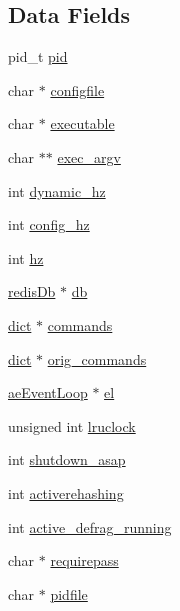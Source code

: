 \subsection*{Data Fields}
\begin{DoxyCompactItemize}
\item 
pid\+\_\+t \hyperlink{structredis_server_ae0d46a978d5cd6707411f276ad869b9c}{pid}
\item 
char $\ast$ \hyperlink{structredis_server_a761e2c812e0a5ab3b7afcbb2586d4012}{configfile}
\item 
char $\ast$ \hyperlink{structredis_server_afa475ce704a1c8de8a4472f89ba59fd4}{executable}
\item 
char $\ast$$\ast$ \hyperlink{structredis_server_a2073b64fc7793a03e76ed750a46dd25e}{exec\+\_\+argv}
\item 
int \hyperlink{structredis_server_abb58a3bfa3d302d8c4b74b7c4f59644b}{dynamic\+\_\+hz}
\item 
int \hyperlink{structredis_server_aeae2d40a88ece004cc0fa4bc228077a8}{config\+\_\+hz}
\item 
int \hyperlink{structredis_server_a873124c5659edc141c67aab7999e314a}{hz}
\item 
\hyperlink{structredis_db}{redis\+Db} $\ast$ \hyperlink{structredis_server_a9bee04e09635a42fef289e42a89f5502}{db}
\item 
\hyperlink{structdict}{dict} $\ast$ \hyperlink{structredis_server_aaa854fe2fafd385073db1c59dfbffc9d}{commands}
\item 
\hyperlink{structdict}{dict} $\ast$ \hyperlink{structredis_server_a2282515ee7614e17de7aeae0db6ea65b}{orig\+\_\+commands}
\item 
\hyperlink{structae_event_loop}{ae\+Event\+Loop} $\ast$ \hyperlink{structredis_server_ada2e0bf12be2309801d2515e67c008e8}{el}
\item 
unsigned int \hyperlink{structredis_server_a99c6b6e30b43c077eb30507d7c1d0813}{lruclock}
\item 
int \hyperlink{structredis_server_a32598da1cf7182e823ebf3d440038455}{shutdown\+\_\+asap}
\item 
int \hyperlink{structredis_server_a0fd4dc9c26fc4a70bfbfe3e97a6c4295}{activerehashing}
\item 
int \hyperlink{structredis_server_abe0f85c6013794d585451f21440f5982}{active\+\_\+defrag\+\_\+running}
\item 
char $\ast$ \hyperlink{structredis_server_a0ba0e84624d22e52e900533adf7d9ba8}{requirepass}
\item 
char $\ast$ \hyperlink{structredis_server_a9319f4233d0597188c3119f4dc7b3f0f}{pidfile}
$$
\end{DoxyCompactItemize}
